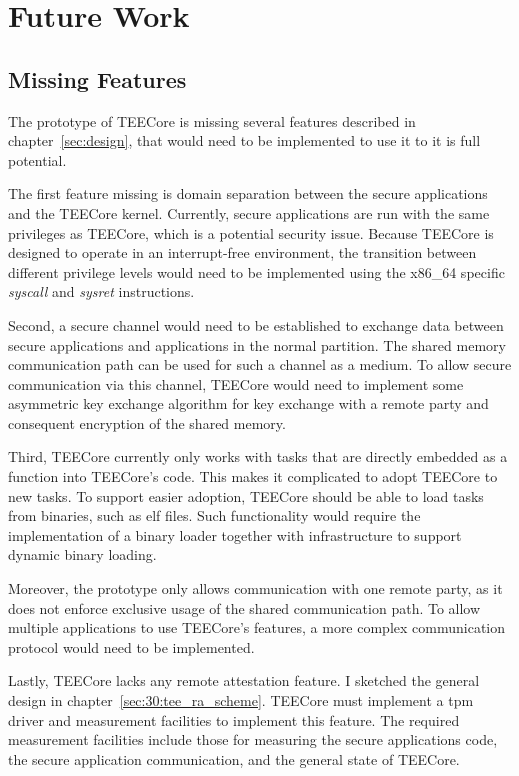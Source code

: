 \chapter{Future Work}
\label{sec:futurework}

\section{Missing Features}
The prototype of TEECore is missing several features described in
chapter~\ref{sec:design}, that would need to be implemented to use it to it is
full potential.

The first feature missing is domain separation between the secure applications
and the TEECore kernel. Currently, secure applications are run with the same
privileges as TEECore, which is a potential security issue. Because TEECore is
designed to operate in an interrupt-free environment, the transition between
different privilege levels would need to be implemented using the x86\_64
specific \textit{syscall} and \textit{sysret} instructions.

Second, a secure channel would need to be established to exchange data between
secure applications and applications in the normal partition. The shared memory
communication path can be used for such a channel as a medium. To allow secure
communication via this channel, TEECore would need to implement some asymmetric
key exchange algorithm for key exchange with a remote party and consequent
encryption of the shared memory.

Third, TEECore currently only works with tasks that are directly embedded as a
function into TEECore's code. This makes it complicated to adopt TEECore to new
tasks. To support easier adoption, TEECore should be able to load tasks from
binaries, such as \gls{elf} files. Such functionality would require the
implementation of a binary loader together with infrastructure to support
dynamic binary loading.

Moreover, the prototype only allows communication with one remote party, as it
does not enforce exclusive usage of the shared communication path. To allow
multiple applications to use TEECore's features, a more complex communication
protocol would need to be implemented.

Lastly, TEECore lacks any remote attestation feature. I sketched the general
design in chapter~\ref{sec:30:tee_ra_scheme}. TEECore must implement a \gls{tpm}
driver and measurement facilities to implement this feature. The required
measurement facilities include those for measuring the secure applications code,
the secure application communication, and the general state of TEECore.


